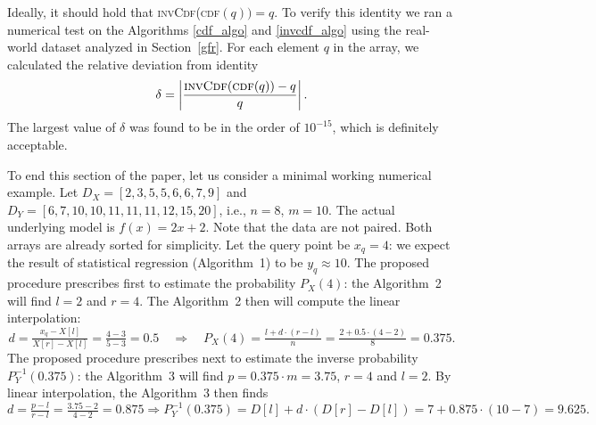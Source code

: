 \documentclass[10pt,final]{siamltex}
\begin{document}
Ideally, it should hold that \textsc{invCdf}(\textsc{cdf}$(q))=q$. To verify this identity we ran a numerical test on the Algorithms \ref{cdf_algo} and \ref{invcdf_algo} using the real-world dataset analyzed in Section~\ref{gfr}. For each element $q$ in the array, we calculated the relative deviation from identity
%
\begin{equation}
  \delta = \left|\frac{\ensuremath{\textsc{invCdf}(\textsc{cdf}}(q)) - q}{q}\right|.
\end{equation}
%
The largest value of $\delta$ was found to be in the order of $10^{-15}$, which is definitely acceptable. %


To end this section of the paper, let us consider a minimal working numerical example. Let $D_X=[2,3,5,5,6,6,7,9]$ and $D_Y=[6,7,10,10,11,11,11,12,15,20]$, i.e., $n=8$, $m=10$. The actual underlying model is $f(x)=2x+2$. Note that the data are not paired. Both arrays are already sorted for simplicity. Let the query point be $x_q=4$: we expect the result of statistical regression (Algorithm~1) to be $y_q\approx10$. The proposed procedure prescribes first to estimate the probability $P_X(4)$: the Algorithm~2 will find $l=2$ and $r=4$. The Algorithm~2 then will compute the linear interpolation:
%
\begin{equation*}
  d = \tfrac{x_q-X[l]}{X[r]-X[l]} = \tfrac{4-3}{5-3} = 0.5 \quad\Rightarrow\quad
  P_X(4)=\tfrac{l+d\cdot(r-l)}{n}=\tfrac{2+0.5\cdot(4-2)}{8}=0.375.
\end{equation*}
%
The proposed procedure prescribes next to estimate the inverse probability $P^{-1}_Y(0.375)$: the Algorithm~3 will find $p = 0.375\cdot m=3.75$, $r=4$ and $l=2$. By linear interpolation, the Algorithm~3 then finds
%
\begin{equation*}
  d = \tfrac{p-l}{r-l} = \tfrac{3.75-2}{4-2} = 0.875 \Rightarrow
  P^{-1}_Y(0.375)=D[l]+d\cdot(D[r]-D[l])=7+0.875\cdot(10-7)=9.625.
\end{equation*}
%
%
\end{document}
